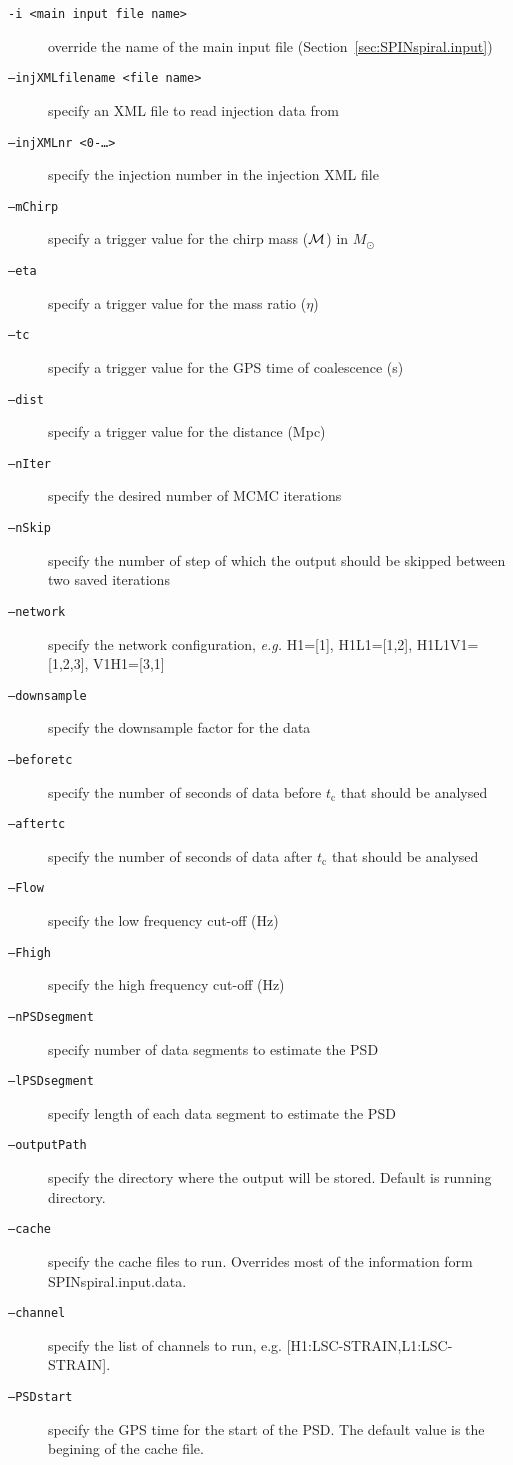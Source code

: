 \documentclass[10pt]{article}
\begin{document}
\begin{description}
  \item[\texttt{-i <main input file name>}] override the name of the main input file (Section~\ref{sec:SPINspiral.input})
  \item[\texttt{--injXMLfilename <file name>}] specify an XML file to read injection data from
  \item[\texttt{--injXMLnr <0-\ldots>}] specify the injection number in the injection XML file

  \item[\texttt{--mChirp}] specify a trigger value for the chirp mass ($\cal{M}$) in $M_\odot$
  \item[\texttt{--eta}] specify a trigger value for the mass ratio ($\eta$)
  \item[\texttt{--tc}] specify a trigger value for the GPS time of coalescence (s)
  \item[\texttt{--dist}] specify a trigger value for the distance (Mpc)
    
  \item[\texttt{--nIter}] specify the desired number of MCMC iterations
  \item[\texttt{--nSkip}] specify the number of step of which the output should be skipped between two saved iterations
  \item[\texttt{--network}] specify the network configuration, \textit{e.g.} H1=[1], H1L1=[1,2], H1L1V1=[1,2,3], V1H1=[3,1]
  \item[\texttt{--downsample}] specify the downsample factor for the data
  \item[\texttt{--beforetc}] specify the number of seconds of data before $t_\mathrm{c}$ that should be analysed
  \item[\texttt{--aftertc}] specify the number of seconds of data after $t_\mathrm{c}$ that should be analysed
  \item[\texttt{--Flow}] specify the low frequency cut-off (Hz)
  \item[\texttt{--Fhigh}] specify the high frequency cut-off (Hz)
  \item[\texttt{--nPSDsegment}] specify number of data segments to estimate the PSD
  \item[\texttt{--lPSDsegment}] specify length of each data segment to estimate the PSD
  \item[\texttt{--outputPath}] specify the directory where the output will be stored. Default is running directory.
  \item[\texttt{--cache}] specify the cache files to run. Overrides most of the information form SPINspiral.input.data.
  \item[\texttt{--channel}] specify the list of channels to run, e.g. [H1:LSC-STRAIN,L1:LSC-STRAIN].
  \item[\texttt{--PSDstart}] specify the GPS time for the start of the PSD. The default value is the begining of the cache file.
  
  
\end{description}
  
\end{document}
